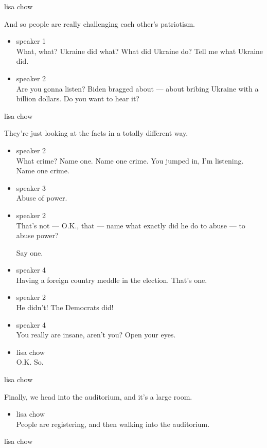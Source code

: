 lisa chow

And so people are really challenging each other's patriotism.

\begin{itemize}
\item
  speaker 1\\
  What, what? Ukraine did what? What did Ukraine do? Tell me what
  Ukraine did.
\item
  speaker 2\\
  Are you gonna listen? Biden bragged about --- about bribing Ukraine
  with a billion dollars. Do you want to hear it?
\end{itemize}

lisa chow

They're just looking at the facts in a totally different way.

\begin{itemize}
\item
  speaker 2\\
  What crime? Name one. Name one crime. You jumped in, I'm listening.
  Name one crime.
\item
  speaker 3\\
  Abuse of power.
\item
  speaker 2\\
  That's not --- O.K., that --- name what exactly did he do to abuse ---
  to abuse power?

  Say one.
\item
  speaker 4\\
  Having a foreign country meddle in the election. That's one.
\item
  speaker 2\\
  He didn't! The Democrats did!
\item
  speaker 4\\
  You really are insane, aren't you? Open your eyes.
\item
  lisa chow\\
  O.K. So.
\end{itemize}

lisa chow

Finally, we head into the auditorium, and it's a large room.

\begin{itemize}
\tightlist
\item
  lisa chow\\
  People are registering, and then walking into the auditorium.
\end{itemize}

lisa chow

